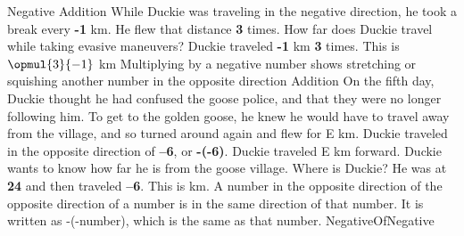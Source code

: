 \documentclass[a4paper,11pt ]{book}
\begin{document}
{Negative Addition}
{While Duckie was traveling in the negative direction, he took a break every \textbf{-1} km. He flew that distance  \textbf{3} times. How far does Duckie travel while taking evasive maneuvers?}
{Duckie traveled \textbf{-1} km \textbf{3} times. This is $\opmul{3}{-1}$ km}
{Multiplying by a negative number shows stretching or squishing another number in the opposite direction}
{Addition}
{On the fifth day, Duckie thought he had confused the goose police, and that they were no longer following him. To get to the golden goose, he knew he would have to travel away from the village, and so turned around again and flew for E km. Duckie traveled in the opposite direction of \textbf{–6}, or \textbf{-(-6)}. Duckie traveled E km forward. Duckie wants to know how far he is from the goose village. Where is Duckie?}
{He was at \textbf{24} and then traveled \textbf{--6}. This is  km.}
{A number in the opposite direction of the opposite direction of a number is in the same direction of that number. It is written as -(-number), which is the same as  that number.}
{NegativeOfNegative}
\end{document}
